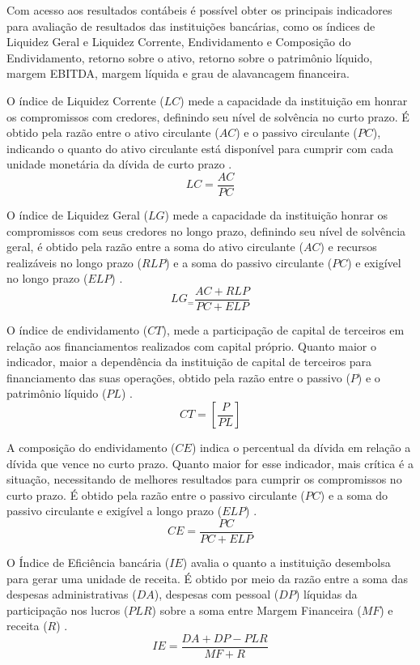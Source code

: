 \documentclass[12pt,12pt,openright,oneside,a4paper,chapter=TITLE,section=TITLE,subsection=TITLE,subsubsection=TITLE,english,french,spanish,portugues,sumario=tradicional]{abntex2}
\begin{document}
Com acesso aos resultados contábeis é possível obter os principais indicadores para avaliação de resultados das instituições bancárias, como os índices de Liquidez Geral e Liquidez Corrente, Endividamento e Composição do Endividamento, retorno sobre o ativo, retorno sobre o patrimônio líquido, margem EBITDA, margem líquida e grau de alavancagem financeira.

O índice de Liquidez Corrente (\(LC\)) mede a capacidade da instituição em honrar os compromissos com credores, definindo seu nível de solvência no curto prazo. É obtido pela razão entre o ativo circulante (\(AC\)) e o passivo circulante (\(PC\)), indicando o quanto do ativo circulante está disponível para cumprir com cada unidade monetária da dívida de curto prazo \cite{graham:2012} \cite{assaf:2020}.
\[
LC = \frac{AC}{PC}
\]

O índice de Liquidez Geral (\(LG\)) mede a capacidade da instituição honrar os compromissos com seus credores no longo prazo, definindo seu nível de solvência geral, é obtido pela razão entre a soma do ativo circulante (\(AC\)) e recursos realizáveis no longo prazo (\(RLP\)) e a soma do passivo circulante (\(PC\)) e exigível no longo prazo (\(ELP\)) \cite{assaf:2020}.
\[
LG_ = \frac{AC + RLP}{PC + ELP}
\]

O índice de endividamento (\(CT\)), mede a participação de capital de terceiros em relação aos financiamentos realizados com capital próprio. Quanto maior o indicador, maior a dependência da instituição de capital de terceiros para financiamento das suas operações, obtido pela razão entre o passivo (\(P\)) e o patrimônio líquido (\(PL\)) \cite{assaf:2020}.
\[
CT = [\frac{P}{PL}]
\]

A composição do endividamento (\(CE\)) indica o percentual da dívida em relação a dívida que vence no curto prazo. Quanto maior for esse indicador, mais crítica é a situação, necessitando de melhores resultados para cumprir os compromissos no curto prazo. É obtido pela razão entre o passivo circulante (\(PC\)) e a soma do passivo circulante e exigível a longo prazo (\(ELP\)) \cite{assaf:2020}.
\[
CE = \frac{PC}{PC + ELP}
\]

O Índice de Eficiência bancária (\(IE\)) avalia o quanto a instituição desembolsa para gerar uma unidade de receita. É obtido por meio da razão entre a soma das despesas administrativas (\(DA\)), despesas com pessoal (\(DP\)) líquidas da participação nos lucros (\(PLR\)) sobre a soma entre Margem Financeira (\(MF\)) e receita (\(R\)) \cite{timotio:2018}.\\
\[
IE = \frac{DA + DP - PLR}{MF + R} 
\]
\end{document}
